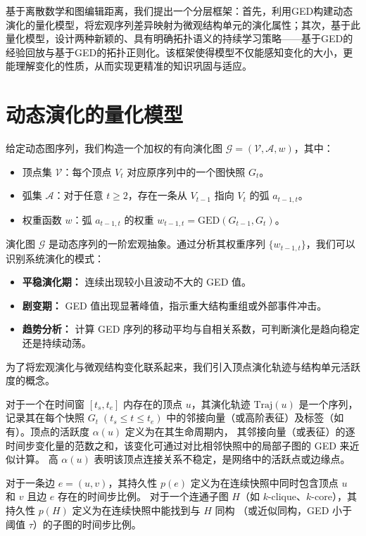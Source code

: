 基于离散数学和图编辑距离，我们提出一个分层框架：首先，利用GED构建动态演化的量化模型，将宏观序列差异映射为微观结构单元的演化属性；其次，基于此量化模型，设计两种新颖的、具有明确拓扑语义的持续学习策略——基于GED的经验回放与基于GED的拓扑正则化。该框架使得模型不仅能感知变化的大小，更能理解变化的性质，从而实现更精准的知识巩固与适应。

\section{动态演化的量化模型}
给定动态图序列，我们构造一个加权的有向演化图 $\mathcal{G}=(\mathcal{V},\mathcal{A},w)$，其中：
\begin{itemize}[leftmargin=*,nosep]
  \item 顶点集 $\mathcal{V}$：每个顶点 $V_t$ 对应原序列中的一个图快照 $G_t$。
  \item 弧集 $\mathcal{A}$：对于任意 $t\ge 2$，存在一条从 $V_{t-1}$ 指向 $V_t$ 的弧 $a_{t-1,t}$。
  \item 权重函数 $w$：弧 $a_{t-1,t}$ 的权重 $w_{t-1,t}=\mathrm{GED}(G_{t-1},G_t)$。
\end{itemize}
演化图 $\mathcal{G}$ 是动态序列的一阶宏观抽象。通过分析其权重序列 $\{w_{t-1,t}\}$，我们可以识别系统演化的模式：
\begin{itemize}[leftmargin=*,nosep]
  \item \textbf{平稳演化期：} 连续出现较小且波动不大的 GED 值。
  \item \textbf{剧变期：} GED 值出现显著峰值，指示重大结构重组或外部事件冲击。
  \item \textbf{趋势分析：} 计算 GED 序列的移动平均与自相关系数，可判断演化是趋向稳定还是持续动荡。
\end{itemize}
为了将宏观演化与微观结构变化联系起来，我们引入顶点演化轨迹与结构单元活跃度的概念。

对于一个在时间窗 $[t_s,t_e]$ 内存在的顶点 $u$，其演化轨迹 $\mathrm{Traj}(u)$ 是一个序列，记录其在每个快照
$G_t\;(t_s\le t\le t_e)$ 中的邻接向量（或高阶表征）及标签（如有）。顶点的活跃度 $\alpha(u)$ 定义为在其生命周期内，
其邻接向量（或表征）的逐时间步变化量的范数之和，该变化可通过对比相邻快照中的局部子图的 GED 来近似计算。
高 $\alpha(u)$ 表明该顶点连接关系不稳定，是网络中的活跃点或边缘点。

对于一条边 $e=(u,v)$，其持久性 $p(e)$ 定义为在连续快照中同时包含顶点 $u$ 和 $v$ 且边 $e$ 存在的时间步比例。
对于一个连通子图 $H$（如 $k$-clique、$k$-core），其持久性 $p(H)$ 定义为在连续快照中能找到与 $H$ 同构
（或近似同构，GED 小于阈值 $\tau$）的子图的时间步比例。

